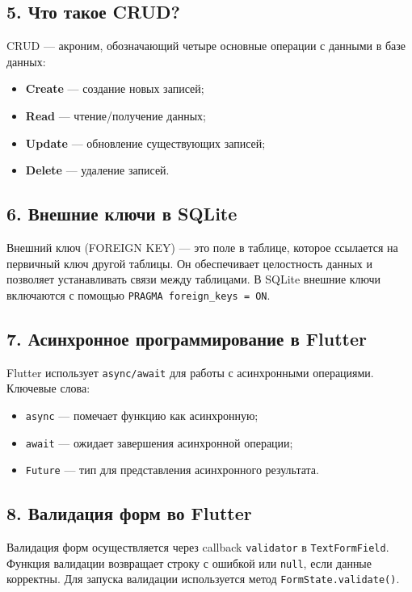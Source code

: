 \documentclass[oneside,a4paper,14pt]{extarticle}
\begin{document}
\subsection*{5. Что такое CRUD?}

CRUD — акроним, обозначающий четыре основные операции с данными в базе данных:
\begin{itemize}
	\item[$-$] \textbf{Create} — создание новых записей;
	\item[$-$] \textbf{Read} — чтение/получение данных;
	\item[$-$] \textbf{Update} — обновление существующих записей;
	\item[$-$] \textbf{Delete} — удаление записей.
\end{itemize}

\subsection*{6. Внешние ключи в SQLite}

Внешний ключ (FOREIGN KEY) — это поле в таблице, которое ссылается на первичный ключ другой таблицы. Он обеспечивает целостность данных и позволяет устанавливать связи между таблицами. В SQLite внешние ключи включаются с помощью \texttt{PRAGMA foreign\_keys = ON}.

\subsection*{7. Асинхронное программирование в Flutter}

Flutter использует \texttt{async/await} для работы с асинхронными операциями. Ключевые слова:
\begin{itemize}
	\item[$-$] \texttt{async} — помечает функцию как асинхронную;
	\item[$-$] \texttt{await} — ожидает завершения асинхронной операции;
	\item[$-$] \texttt{Future} — тип для представления асинхронного результата.
\end{itemize}

\subsection*{8. Валидация форм во Flutter}

Валидация форм осуществляется через callback \texttt{validator} в \texttt{TextFormField}. Функция валидации возвращает строку с ошибкой или \texttt{null}, если данные корректны. Для запуска валидации используется метод \texttt{FormState.validate()}.
\end{document}
